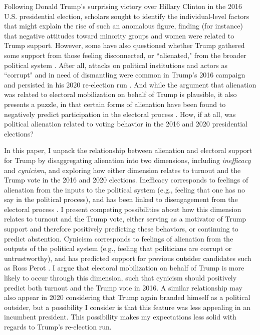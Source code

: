 \documentclass[12pt]{article}
\begin{document}
Following Donald Trump's surprising victory over Hillary Clinton in the 2016 U.S. presidential election, scholars sought to identify the individual-level factors that might explain the rise of such an anomalous figure, finding (for instance) that negative attitudes toward minority groups \parencite{hooghe2018explaining,sides2018identity,mason2021activating} and women \parencite{valentino2018mobilizing} were related to Trump support. However, some have also questioned whether Trump gathered some support from those feeling disconnected, or ``alienated," from the broader political system \parencite[e.g.,][]{dyck2018primary,uscinski2021american}. After all, attacks on political institutions and actors as ``corrupt" and in need of dismantling were common in Trump's 2016 campaign and persisted in his 2020 re-election run \parencite{parker2020permanent}. And while the argument that alienation was related to electoral mobilization on behalf of Trump is plausible, it also presents a puzzle, in that certain forms of alienation have been found to negatively predict participation in the electoral process \parencite[e.g.][]{templeton1966alienation}. How, if at all, was political alienation related to voting behavior in the 2016 and 2020 presidential elections?

In this paper, I unpack the relationship between alienation and electoral support for Trump by disaggregating alienation into two dimensions, including \textit{inefficacy} and \textit{cynicism}, and exploring how either dimension relates to turnout and the Trump vote in the 2016 and 2020 elections. Inefficacy corresponds to feelings of alienation from the inputs to the political system (e.g., feeling that one has no say in the political process), and has been linked to disengagement from the electoral process \parencite{southwell2003politics}. I present competing possibilities about how this dimension relates to turnout and the Trump vote, either serving as a motivator of Trump support and therefore positively predicting these behaviors, or continuing to predict abstention. Cynicism corresponds to feelings of alienation from the outputs of the political system (e.g., feeling that politicians are corrupt or untrustworthy), and has predicted support for previous outsider candidates such as Ross Perot \parencite{southwell1998electoral}. I argue that electoral mobilization on behalf of Trump is more likely to occur through this dimension, such that cynicism should positively predict both turnout and the Trump vote in 2016. A similar relationship may also appear in 2020 considering that Trump again branded himself as a political outsider, but a possibility I consider is that this feature was less appealing in an incumbent president. This possibility makes my expectations less solid with regards to Trump's re-election run. 
\end{document}
